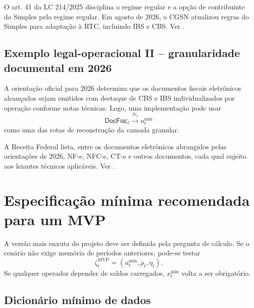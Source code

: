 \documentclass[11pt,a4paper]{article}
\newcommand{\cN}{\mathcal{N}}
\begin{document}
\begin{fonte}
O art. 41 da LC 214/2025 disciplina o regime regular e a opção de contribuinte do Simples pelo regime regular. Em agosto de 2026, o CGSN atualizou regras do Simples para adaptação à RTC, incluindo IBS e CBS. Ver \cite{LC214,RFB_SIMPLES_2026}.
\end{fonte}

\subsection{Exemplo legal-operacional II -- granularidade documental em 2026}

A orientação oficial para 2026 determina que os documentos fiscais eletrônicos alcançados sejam emitidos com destaque de CBS e IBS individualizados por operação conforme notas técnicas. Logo, uma implementação pode usar
\[
\mathsf{DocFisc}_t\xrightarrow{\cN_t}u_t^{\min}
\]
como uma das rotas de reconstrução da camada granular.

\begin{fonte}
A Receita Federal lista, entre os documentos eletrônicos abrangidos pelas orientações de 2026, NF-e, NFC-e, CT-e e outros documentos, cada qual sujeito aos leiautes técnicos aplicáveis. Ver \cite{RFB_ORIENT_2026}.
\end{fonte}

\section{Especificação mínima recomendada para um MVP}

A versão mais enxuta do projeto deve ser definida pela pergunta de cálculo. Se o cenário não exige memória de períodos anteriores, pode-se testar
\begin{equation}
\boxed{
\zeta_t^{\mathrm{MVP}}
=(u_t^{\min},\rho_t,\eta_t).
}
\label{eq:mvp}
\end{equation}
Se qualquer operador depender de saldos carregados, $x_t^{\min}$ volta a ser obrigatório.

\subsection{Dicionário mínimo de dados}
\end{document}
